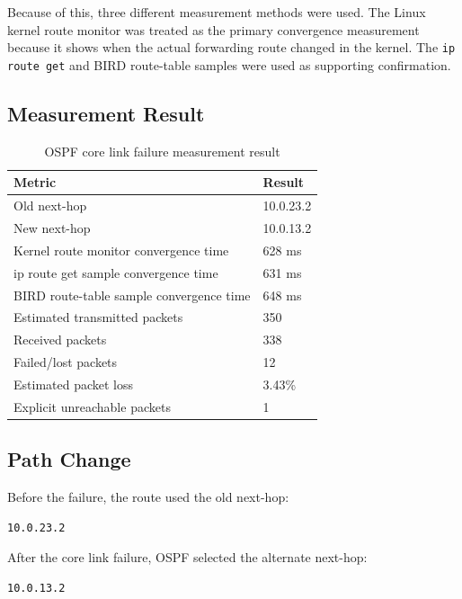 Because of this, three different measurement methods were used. The Linux kernel route monitor was treated as the primary convergence measurement because it shows when the actual forwarding route changed in the kernel. The \texttt{ip route get} and BIRD route-table samples were used as supporting confirmation.

\subsection{Measurement Result}

\begin{table}[h]
\centering
\begin{tabular}{|l|l|}
\hline
\textbf{Metric} & \textbf{Result} \\
\hline
Old next-hop & 10.0.23.2 \\
\hline
New next-hop & 10.0.13.2 \\
\hline
Kernel route monitor convergence time & 628 ms \\
\hline
ip route get sample convergence time & 631 ms \\
\hline
BIRD route-table sample convergence time & 648 ms \\
\hline
Estimated transmitted packets & 350 \\
\hline
Received packets & 338 \\
\hline
Failed/lost packets & 12 \\
\hline
Estimated packet loss & 3.43\% \\
\hline
Explicit unreachable packets & 1 \\
\hline
\end{tabular}
\caption{OSPF core link failure measurement result}
\end{table}

\subsection{Path Change}

Before the failure, the route used the old next-hop:

\begin{verbatim}
10.0.23.2
\end{verbatim}

After the core link failure, OSPF selected the alternate next-hop:

\begin{verbatim}
10.0.13.2
\end{verbatim}

